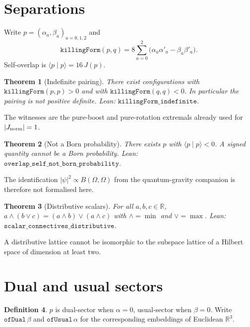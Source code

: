\documentclass[dvipdfmx,11pt,a4paper]{article}
\newtheorem{theorem}{Theorem}[section]
\theoremstyle{definition}
\newtheorem{definition}[theorem]{Definition}
\theoremstyle{remark}
\newcommand{\Jnorm}{J_{\rm norm}}
\begin{document}
\section{Separations}
\label{sec:sep}

Write $p=(\alpha_a,\beta_a)_{a=0,1,2}$ and
\[
\texttt{killingForm}(p,q)
= 8\sum_{a=0}^{2}\bigl(\alpha_a\alpha'_a-\beta_a\beta'_a\bigr).
\]
Self-overlap is $\langle p\mid p\rangle=16\,J(p)$.

\begin{theorem}[Indefinite pairing]
\label{thm:indef}
There exist configurations with $\texttt{killingForm}(p,p)>0$ and with
$\texttt{killingForm}(q,q)<0$. In particular the pairing is not
positive definite. Lean: $\texttt{killingForm\_indefinite}$.
\end{theorem}

The witnesses are the pure-boost and pure-rotation extremals already
used for $\lvert\Jnorm\rvert=1$.

\begin{theorem}[Not a Born probability]
\label{thm:born}
There exists $p$ with $\langle p\mid p\rangle<0$. A signed quantity
cannot be a Born probability. Lean:
$\texttt{overlap\_self\_not\_born\_probability}$.
\end{theorem}

The identification $\lvert\psi\rvert^2\propto B(\Omega,\Omega)$ from
the quantum-gravity companion is therefore not formalised here.

\begin{theorem}[Distributive scalars]
\label{thm:dist}
For all $a,b,c\in\mathbb{R}$,
$a\wedge(b\vee c)=(a\wedge b)\vee(a\wedge c)$ with
$\wedge=\min$ and $\vee=\max$. Lean:
$\texttt{scalar\_connectives\_distributive}$.
\end{theorem}

A distributive lattice cannot be isomorphic to the subspace lattice of
a Hilbert space of dimension at least two.

\section{Dual and usual sectors}
\label{sec:sector}

\begin{definition}
$p$ is dual-sector when $\alpha=0$, usual-sector when $\beta=0$.
Write $\texttt{ofDual}\,\beta$ and $\texttt{ofUsual}\,\alpha$ for the
corresponding embeddings of Euclidean $\mathbb{R}^3$.
\end{definition}
\end{document}
